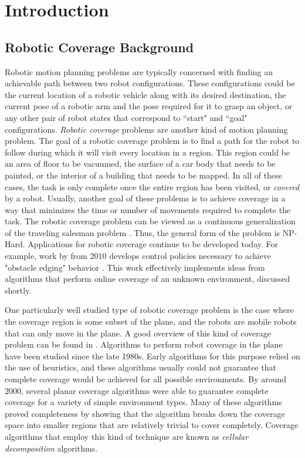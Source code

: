 \chapter{Introduction}

\section{Robotic Coverage Background}

Robotic motion planning problems are typically concerned with finding an achievable path between two robot configurations. These configurations could be the current location of a robotic vehicle along with its desired destination, the current pose of a robotic arm and the pose required for it to grasp an object, or any other pair of robot states that correspond to ``start" and ``goal" configurations. \textit{Robotic coverage} problems are another kind of motion planning problem. The goal of a robotic coverage problem is to find a path for the robot to follow during which it will visit every location in a region. This region could be an area of floor to be vacuumed, the surface of a car body that needs to be painted, or the interior of a building that needs to be mapped. In all of these cases, the task is only complete once the entire region has been visited, or \textit{covered} by a robot. Usually, another goal of these problems is to achieve coverage in a way that minimizes the time or number of movements required to complete the task. The robotic coverage problem can be viewed as a continuous generalization of the traveling salesman problem \cite{Arkin1993}. Thus, the general form of the problem is NP-Hard. Applications for robotic coverage continue to be developed today. For example, work by \citeauthor{Daltorio} from 2010 develops control policies necessary to achieve "obstacle edging" behavior \cite{Daltorio}. This work effectively implements ideas from algorithms that perform online coverage of an unknown environment, discussed shortly.

One particularly well studied type of robotic coverage problem is the case where the coverage region is some subset of the plane, and the robots are mobile robots that can only move in the plane. A good overview of this kind of coverage problem can be found in \cite{Choset}. Algorithms to perform robot coverage in the plane have been studied since the late 1980s. Early algorithms for this purpose relied on the use of heuristics, and these algorithms usually could not guarantee that complete coverage would be achieved for all possible environments. By around 2000, several planar coverage algorithms were able to guarantee complete coverage for a variety of simple environment types. Many of these algorithms proved completeness by showing that the algorithm breaks down the coverage space into smaller regions that are relatively trivial to cover completely. Coverage algorithms that employ this kind of technique are known as \textit{cellular decomposition} algorithms.

